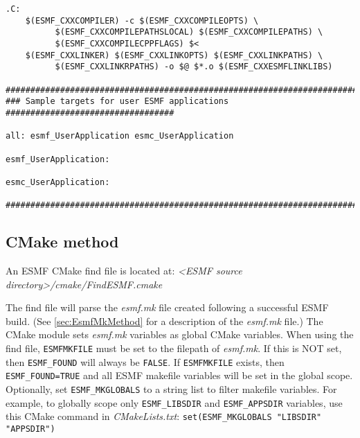 \begin{verbatim}
.C:
	$(ESMF_CXXCOMPILER) -c $(ESMF_CXXCOMPILEOPTS) \
          $(ESMF_CXXCOMPILEPATHSLOCAL) $(ESMF_CXXCOMPILEPATHS) \
          $(ESMF_CXXCOMPILECPPFLAGS) $<
	$(ESMF_CXXLINKER) $(ESMF_CXXLINKOPTS) $(ESMF_CXXLINKPATHS) \
          $(ESMF_CXXLINKRPATHS) -o $@ $*.o $(ESMF_CXXESMFLINKLIBS)

################################################################################
### Sample targets for user ESMF applications ##################################

all: esmf_UserApplication esmc_UserApplication

esmf_UserApplication:

esmc_UserApplication:

################################################################################

\end{verbatim}


\subsection{CMake method}

An ESMF CMake find file is located at: \textit{<ESMF source directory>/cmake/FindESMF.cmake}

The find file will parse the \textit{esmf.mk} file created following a successful
ESMF build. (See \ref{sec:EsmfMkMethod} for a description of the \textit{esmf.mk} file.)
The CMake module sets \textit{esmf.mk} variables as global CMake variables. When
using the find file, {\tt ESMFMKFILE} must be set to the filepath of \textit{esmf.mk}.
If this is NOT set, then {\tt ESMF\_FOUND} will always be {\tt FALSE}. If {\tt ESMFMKFILE}
exists, then {\tt ESMF\_FOUND=TRUE} and all ESMF makefile variables will be set
in the global scope. Optionally, set {\tt ESMF\_MKGLOBALS} to a string list to
filter makefile variables. For example, to globally scope only {\tt ESMF\_LIBSDIR}
and {\tt ESMF\_APPSDIR} variables, use this CMake command in \textit{CMakeLists.txt}: \verb|set(ESMF_MKGLOBALS "LIBSDIR" "APPSDIR")|
